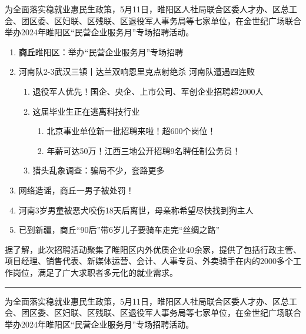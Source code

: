\documentclass{ctexart}
\newcommand{\litem}[1]{\item{\bfseries\color{blue}#1}}
\begin{document}
为全面落实稳就业惠民生政策，5月11日，睢阳区人社局联合区委人才办、区总工会、团区委、区妇联、区残联、区退役军人事务局等七家单位，在金世纪广场联合举办2024年睢阳区“民营企业服务月”专场招聘活动。	
	
\begin{enumerate}

	\litem {商丘}睢阳区：举办“民营企业服务月”专场招聘
	\item 河南队2-3武汉三镇丨达兰双响恩里克点射绝杀 河南队遭遇四连败
	\begin{enumerate}
		\item 退役军人优先！国企、央企、上市公司、军创企业招聘超2000人
		\item 这届毕业生正在逃离科技行业
		\begin{enumerate}
			\item 北京事业单位新一批招聘来啦！超600个岗位！
			\item 年薪可达50万！江西三地公开招聘9名聘任制公务员！
		\end{enumerate}
		\item 猎头乱象调查：骗局不少，套路更多
	\end{enumerate}
	\item 网络造谣，商丘一男子被处罚！
	\item 河南3岁男童被恶犬咬伤18天后离世，母亲称希望尽快找到狗主人
	\item 已到新疆，商丘“90后”带6岁儿子要骑车走完“丝绸之路”
\end{enumerate}
	
据了解，此次招聘活动聚集了睢阳区内外优质企业40余家，提供了包括行政主管、项目经理、销售代表、新媒体运营、会计、人事专员、外卖骑手在内的2000多个工作岗位，满足了广大求职者多元化的就业需求。
	
	
\vspace{0.5cm}
\rule{0.5\textwidth}{0.4pt}
\vspace{0.5cm}


为全面落实稳就业惠民生政策，5月11日，睢阳区人社局联合区委人才办、区总工会、团区委、区妇联、区残联、区退役军人事务局等七家单位，在金世纪广场联合举办2024年睢阳区“民营企业服务月”专场招聘活动。	
\end{document}
